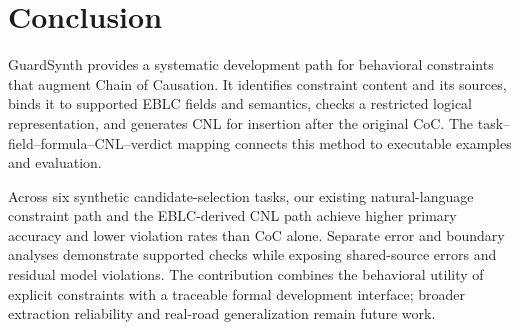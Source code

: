 \documentclass[nolineno]{ieeeaccess}
\begin{document}
\section{Conclusion}

GuardSynth provides a systematic development path for behavioral constraints that augment Chain of Causation. It identifies constraint content and its sources, binds it to supported EBLC fields and semantics, checks a restricted logical representation, and generates CNL for insertion after the original CoC. The task--field--formula--CNL--verdict mapping connects this method to executable examples and evaluation.\par

Across six synthetic candidate-selection tasks, our existing natural-language constraint path and the EBLC-derived CNL path achieve higher primary accuracy and lower violation rates than CoC alone. Separate error and boundary analyses demonstrate supported checks while exposing shared-source errors and residual model violations. The contribution combines the behavioral utility of explicit constraints with a traceable formal development interface; broader extraction reliability and real-road generalization remain future work.\par
\end{document}

